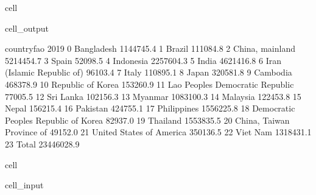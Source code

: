 \documentclass[letterpaper,10pt,english]{jupyterBook}
\begin{document}
\begin{sphinxuseclass}{cell}
\begin{sphinxVerbatimOutput}
\begin{sphinxuseclass}{cell_output}
\begin{sphinxVerbatim}[commandchars=\\\{\}]
                              country\PYGZus{}fao        2019  
0                              Bangladesh   1144745.4  
1                                  Brazil    111084.8  
2                         China, mainland   5214454.7  
3                                   Spain     52098.5  
4                               Indonesia   2257604.3  
5                                   India   4621416.8  
6              Iran (Islamic Republic of)     96103.4  
7                                   Italy    110895.1  
8                                   Japan    320581.8  
9                                Cambodia    468378.9  
10                      Republic of Korea    153260.9  
11       Lao People\PYGZsq{}s Democratic Republic     77005.5  
12                              Sri Lanka    102156.3  
13                                Myanmar   1083100.3  
14                               Malaysia    122453.8  
15                                  Nepal    156215.4  
16                               Pakistan    424755.1  
17                            Philippines   1556225.8  
18  Democratic People\PYGZsq{}s Republic of Korea     82937.0  
19                               Thailand   1553835.5  
20              China, Taiwan Province of     49152.0  
21               United States of America    350136.5  
22                               Viet Nam   1318431.1  
23                                  Total  23446028.9  
\end{sphinxVerbatim}

\end{sphinxuseclass}\end{sphinxVerbatimOutput}

\end{sphinxuseclass}
\begin{sphinxuseclass}{cell}\begin{sphinxVerbatimInput}

\begin{sphinxuseclass}{cell_input}
\begin{sphinxVerbatim}[commandchars=\\\{\}]
   
\end{sphinxVerbatim}

\end{sphinxuseclass}\end{sphinxVerbatimInput}

\end{sphinxuseclass}
\end{document}
